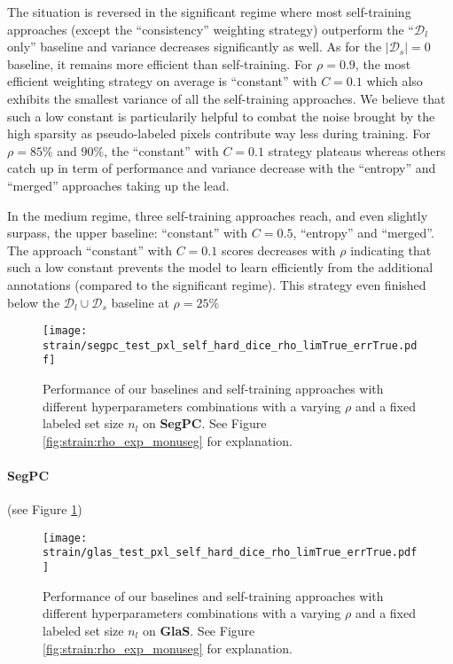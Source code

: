 The situation is reversed in the significant regime where most self-training approaches (except the ``consistency'' weighting strategy) outperform the ``$\mathcal{D}_l$ only'' baseline and variance decreases significantly as well. As for the $|\mathcal{D}_s| = 0$ baseline, it remains more efficient than self-training. For $\rho = 0.9$, the most efficient weighting strategy on average is ``constant'' with $C = 0.1$ which also exhibits the smallest variance of all the self-training approaches. We believe that such a low constant is particularily helpful to combat the noise brought by the high sparsity as pseudo-labeled pixels contribute way less during training. For $\rho = 85\%$ and $90\%$, the ``constant'' with $C = 0.1$ strategy plateaus whereas others catch up in term of performance and variance decrease with the ``entropy'' and ``merged'' approaches taking up the lead.

In the medium regime, three self-training approaches reach, and even slightly surpass, the upper baseline: ``constant'' with $C = 0.5$, ``entropy'' and ``merged''. The approach ``constant'' with $C=0.1$ scores decreases with $\rho$ indicating that such a low constant prevents the model to learn efficiently from the additional annotations (compared to the significant regime). This strategy even finished below the $\mathcal{D}_l \cup \mathcal{D}_s$ baseline at $\rho = 25\%$

\begin{figure}
  \centering
  \texttt{[image: strain/segpc\_test\_pxl\_self\_hard\_dice\_rho\_limTrue\_errTrue.pdf]}
  \caption{Performance of our baselines and self-training approaches with different hyperparameters combinations with a varying $\rho$ and a fixed labeled set size $n_l$ on \textbf{SegPC}. See Figure \ref{fig:strain:rho_exp_monuseg} for explanation.}
  \label{fig:strain:rho_exp_segpc}
\end{figure}

\paragraph{SegPC} (see Figure \ref{fig:strain:rho_exp_segpc})


\begin{figure}
  \centering
  \texttt{[image: strain/glas\_test\_pxl\_self\_hard\_dice\_rho\_limTrue\_errTrue.pdf]}
  \caption{Performance of our baselines and self-training approaches with different hyperparameters combinations with a varying $\rho$ and a fixed labeled set size $n_l$ on \textbf{GlaS}. See Figure \ref{fig:strain:rho_exp_monuseg} for explanation.}
  \label{fig:strain:rho_exp_glas}
\end{figure}

